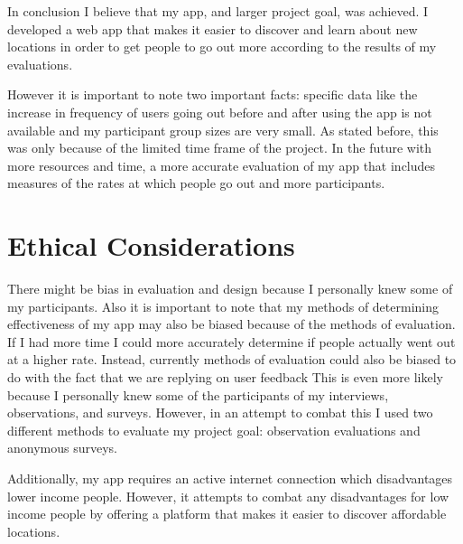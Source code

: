 \documentclass[12pt,twocolumn]{article}
\begin{document}
In conclusion I believe that my app, and larger project goal, was achieved. I developed a web app that makes it easier to discover and learn about new locations in order to get people to go out more according to the results of my evaluations.

However it is important to note two important facts: specific data like the increase in frequency of users going out before and after using the app is not available and my participant group sizes are very small. As stated before, this was only because of the limited time frame of the project. In the future with more resources and time, a more accurate evaluation of my app that includes measures of  the rates at which people go out  and more participants.



\section{Ethical Considerations}
There might be bias in evaluation and design because I personally knew some of my participants. Also it is important to note that my methods of determining effectiveness of my app may also be biased because of the methods of evaluation. If I had more time I could more accurately determine if people actually went out at a higher rate. Instead, currently methods of evaluation could also be biased to do with the fact that we are replying on user feedback This is even more likely because I personally knew some of the participants of my interviews, observations, and surveys. However, in an attempt to combat this I used two different methods to evaluate my project goal: observation evaluations and anonymous surveys. 


Additionally, my app requires an active internet connection which disadvantages lower income people. However, it attempts to combat any disadvantages for low income people by offering a platform that makes it easier to discover affordable locations.  
\end{document}
